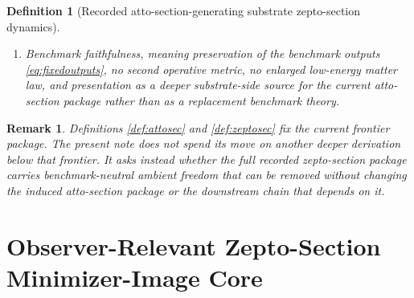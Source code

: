\documentclass[11pt]{article}
\newcommand{\AttoSectionShell}[1]{\mathcal Z_{#1}^{\mathrm{attosec}}}
\newcommand{\ZeptoSectionProj}[1]{\Pi_{#1}^{\mathrm{zeptosec}}}
\newcommand{\ZeptoSectionFiber}[2]{\mathcal F_{#1}^{\mathrm{zeptosec}}(#2)}
\newcommand{\ZeptoSectionFunctional}[1]{\mathscr U_{#1}^{\mathrm{zeptosec}}}
\newcommand{\ZeptoSectionShell}[1]{\mathcal Z_{#1}^{\mathrm{zeptosec}}}
\newtheorem{definition}{Definition}
\newtheorem{remark}{Remark}
\begin{document}
\begin{definition}[Recorded atto-section-generating substrate zepto-section dynamics]
\begin{enumerate}
\[\begin{array}{l}
    \ZeptoSectionFunctional{\sigma}(q)
    =
    \displaystyle\min_{r\in\ZeptoSectionFiber{\sigma}{\ZeptoSectionProj{\sigma}(q)}}
    \ZeptoSectionFunctional{\sigma}(r)
    \end{array}
    \right\},
    \]
    and
    \[
    \ZeptoSectionProj{\sigma}\big|_{\ZeptoSectionShell{\sigma}}
    :
    \ZeptoSectionShell{\sigma}\xrightarrow{\cong}\AttoSectionShell{\sigma}
    \]
    is a diffeomorphism.
    \item Benchmark faithfulness, meaning preservation of the benchmark outputs \eqref{eq:fixedoutputs}, no second operative metric, no enlarged low-energy matter law, and presentation as a deeper substrate-side source for the current atto-section package rather than as a replacement benchmark theory.
\end{enumerate}
\end{definition}

\begin{remark}
Definitions \ref{def:attosec} and \ref{def:zeptosec} fix the current frontier package. The present note does not spend its move on another deeper derivation below that frontier. It asks instead whether the full recorded zepto-section package carries benchmark-neutral ambient freedom that can be removed without changing the induced atto-section package or the downstream chain that depends on it.
\end{remark}

\section{Observer-Relevant Zepto-Section Minimizer-Image Core}
\end{document}
